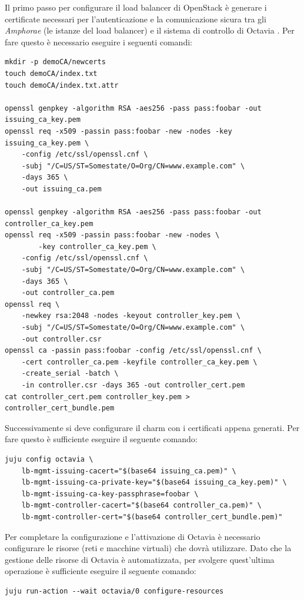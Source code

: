 Il primo passo per configurare il load balancer di OpenStack è generare i certificate necessari per l'autenticazione e la comunicazione sicura tra gli \emph{Amphorae} (le istanze del load balancer) e il sistema di controllo di Octavia \cite{load_balancer_installation_guide}. Per fare questo è necessario eseguire i seguenti comandi:
\begin{lstlisting}[language=mybash]
mkdir -p demoCA/newcerts
touch demoCA/index.txt
touch demoCA/index.txt.attr

openssl genpkey -algorithm RSA -aes256 -pass pass:foobar -out issuing_ca_key.pem
openssl req -x509 -passin pass:foobar -new -nodes -key issuing_ca_key.pem \
    -config /etc/ssl/openssl.cnf \
    -subj "/C=US/ST=Somestate/O=Org/CN=www.example.com" \
    -days 365 \
    -out issuing_ca.pem

openssl genpkey -algorithm RSA -aes256 -pass pass:foobar -out controller_ca_key.pem
openssl req -x509 -passin pass:foobar -new -nodes \
        -key controller_ca_key.pem \
    -config /etc/ssl/openssl.cnf \
    -subj "/C=US/ST=Somestate/O=Org/CN=www.example.com" \
    -days 365 \
    -out controller_ca.pem
openssl req \
    -newkey rsa:2048 -nodes -keyout controller_key.pem \
    -subj "/C=US/ST=Somestate/O=Org/CN=www.example.com" \
    -out controller.csr
openssl ca -passin pass:foobar -config /etc/ssl/openssl.cnf \
    -cert controller_ca.pem -keyfile controller_ca_key.pem \
    -create_serial -batch \
    -in controller.csr -days 365 -out controller_cert.pem
cat controller_cert.pem controller_key.pem > controller_cert_bundle.pem
\end{lstlisting}

Successivamente si deve configurare il charm con i certificati appena generati. Per fare questo è sufficiente eseguire il seguente comando:
\begin{lstlisting}[language=mybash]
juju config octavia \
    lb-mgmt-issuing-cacert="$(base64 issuing_ca.pem)" \
    lb-mgmt-issuing-ca-private-key="$(base64 issuing_ca_key.pem)" \
    lb-mgmt-issuing-ca-key-passphrase=foobar \
    lb-mgmt-controller-cacert="$(base64 controller_ca.pem)" \
    lb-mgmt-controller-cert="$(base64 controller_cert_bundle.pem)"
\end{lstlisting}

Per completare la configurazione e l'attivazione di Octavia è necessario configurare le risorse (reti e macchine virtuali) che dovrà utilizzare. Dato che la gestione delle risorse di Octavia è automatizzata, per svolgere quest'ultima operazione è sufficiente eseguire il seguente comando:
\begin{lstlisting}[language=mybash]
juju run-action --wait octavia/0 configure-resources
\end{lstlisting}

